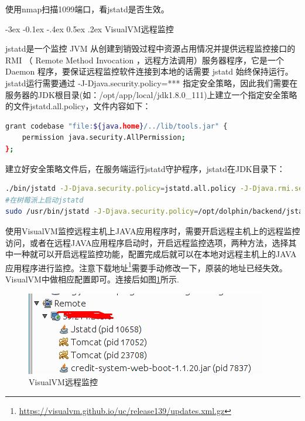 \documentclass[12pt]{book}
\makeatletter
\numberwithin{dummy}{section}
\theoremstyle{ocrenumbox}
\theoremstyle{blacknumex}
\theoremstyle{blacknumbox}
\theoremstyle{ocrenum}
\renewcommand{\subsection}{\@startsection {subsection}{2}{\z@}
	{-3ex \@plus -0.1ex \@minus -.4ex}
	{0.5ex \@plus.2ex }
	{\normalfont\sffamily\bfseries}}
\makeatother
\begin{document}
使用nmap扫描1099端口，看jstatd是否生效。

\subsection{VisualVM远程监控}

jstatd是一个监控 JVM 从创建到销毁过程中资源占用情况并提供远程监控接口的 RMI （ Remote Method Invocation ，远程方法调用）服务器程序，它是一个 Daemon 程序，要保证远程监控软件连接到本地的话需要 jstatd 始终保持运行。jstatd运行需要通过 -J-Djava.security.policy=*** 指定安全策略，因此我们需要在服务器的JDK根目录(如：/opt/app/local/jdk1.8.0\_111)上建立一个指定安全策略的文件jstatd.all.policy，文件内容如下：

\begin{lstlisting}[language=Bash]
grant codebase "file:${java.home}/../lib/tools.jar" {  
	permission java.security.AllPermission;  
}; 
\end{lstlisting}


建立好安全策略文件后，在服务端运行jstatd守护程序，jstatd在JDK目录下：

\begin{lstlisting}[language=Bash]
./bin/jstatd -J-Djava.security.policy=jstatd.all.policy -J-Djava.rmi.server.hostname=10.10.1.12 -J-Djava.rmi.server.logCalls=true -p 1011
#在树莓派上启动jstatd
sudo /usr/bin/jstatd -J-Djava.security.policy=/opt/dolphin/backend/jstatd.all.policy -J-Djava.rmi.server.hostname=192.168.31.25 -J-Djava.rmi.server.logCalls=true -p 1011
\end{lstlisting}

使用VisualVM监控远程主机上JAVA应用程序时，需要开启远程主机上的远程监控访问，或者在远程JAVA应用程序启动时，开启远程监控选项，两种方法，选择其中一种就可以开启远程监控功能，配置完成后就可以在本地对远程主机上的JAVA应用程序进行监控。注意下载地址\footnote{\url{https://visualvm.github.io/uc/release139/updates.xml.gz}}需要手动修改一下，原装的地址已经失效。VisualVM中做相应配置即可。连接后如图\ref{fig:visualvmconnectremote}所示.

\begin{figure}[htbp]
	\centering
	\includegraphics[scale=0.7]{visualvmconnectremote.png}
	\caption{VisualVM远程监控}
	\label{fig:visualvmconnectremote}
\end{figure}
\end{document}
